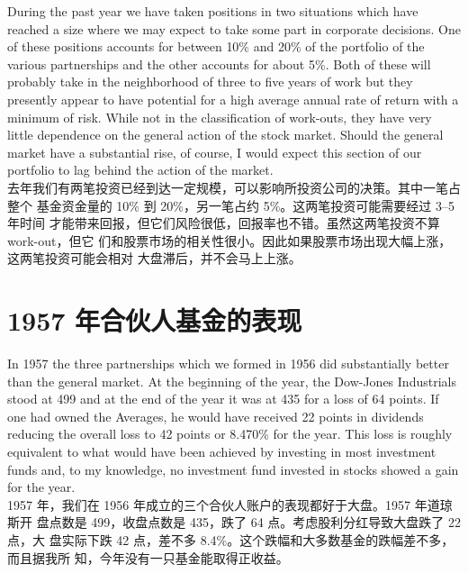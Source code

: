 \begin{verseparallel}
  {
    During the past year we have taken positions in two situations which have
    reached a size where we may expect to take some part in corporate decisions.
    One of these positions accounts for between 10\% and 20\% of the portfolio
    of the various partnerships and the other accounts for about 5\%. Both of
    these will probably take in the neighborhood of three to five years of work
    but they presently appear to have potential for a high average annual rate
    of return with a minimum of risk. While not in the classification of
    work-outs, they have very little dependence on the general action of the
    stock market. Should the general market have a substantial rise, of course,
    I would expect this section of our portfolio to lag behind the action of the
    market. \\
  }
  {
    去年我们有两笔投资已经到达一定规模，可以影响所投资公司的决策。其中一笔占整个
    基金资金量的 10\% 到 20\%，另一笔占约 5\%。这两笔投资可能需要经过 3--5 年时间
    才能带来回报，但它们风险很低，回报率也不错。虽然这两笔投资不算 work-out，但它
    们和股票市场的相关性很小。因此如果股票市场出现大幅上涨，这两笔投资可能会相对
    大盘滞后，并不会马上上涨。
  }
\end{verseparallel}

\section{1957 年合伙人基金的表现}

\begin{verseparallel}
  {
    In 1957 the three partnerships which we formed in 1956 did substantially
    better than the general market. At the beginning of the year, the Dow-Jones
    Industrials stood at 499 and at the end of the year it was at 435 for a loss
    of 64 points. If one had owned the Averages, he would have received 22
    points in dividends reducing the overall loss to 42 points or 8.470\% for
    the year. This loss is roughly equivalent to what would have been achieved
    by investing in most investment funds and, to my knowledge, no investment
    fund invested in stocks showed a gain for the year. \\
  }
  {
    1957 年，我们在 1956 年成立的三个合伙人账户的表现都好于大盘。1957 年道琼斯开
    盘点数是 499，收盘点数是 435，跌了 64 点。考虑股利分红导致大盘跌了 22 点，大
    盘实际下跌 42 点，差不多 8.4\%。这个跌幅和大多数基金的跌幅差不多，而且据我所
    知，今年没有一只基金能取得正收益。
  }
\end{verseparallel}


